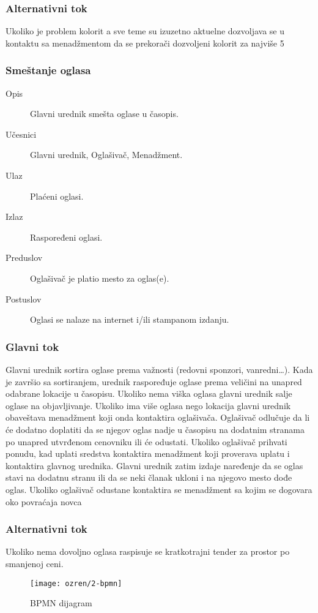 \subsubsection{Alternativni tok}
Ukoliko je problem kolorit a sve teme su izuzetno aktuelne dozvoljava se u kontaktu sa menadžmentom da se prekorači dozvoljeni kolorit za najviše 5%

\subsubsection{Smeštanje oglasa}
\begin{description}
\item [Opis] Glavni urednik smešta oglase u časopis.
\item [Učesnici] Glavni urednik, Oglašivač, Menadžment.
\item [Ulaz] Plaćeni oglasi.
\item [Izlaz] Raspoređeni oglasi.
\item [Preduslov] Oglašivač je platio mesto za oglas(e).
\item [Postuslov] Oglasi se nalaze na internet i/ili stampanom izdanju.
\end{description}   
\subsubsection{Glavni tok}
Glavni urednik sortira oglase prema važnosti (redovni sponzori, vanredni…). Kada je završio sa sortiranjem, urednik raspoređuje oglase prema veličini na unapred odabrane lokacije u časopisu. Ukoliko nema viška oglasa glavni urednik salje oglase na objavljivanje. Ukoliko ima više oglasa nego lokacija glavni urednik obaveštava menadžment koji onda kontaktira oglašivača. Oglašivač odlučuje da li će dodatno doplatiti da se njegov oglas nadje u časopisu na dodatnim stranama po unapred utvrđenom cenovniku ili će odustati. Ukoliko oglašivač prihvati ponudu, kad uplati sredstva kontaktira menadžment koji proverava uplatu i kontaktira glavnog urednika. Glavni urednik zatim izdaje naređenje da se oglas stavi na dodatnu stranu ili da se neki članak ukloni i na njegovo mesto dođe oglas. Ukoliko oglašivač odustane kontaktira se menadžment sa kojim se dogovara oko povraćaja novca
\subsubsection{Alternativni tok}
Ukoliko nema dovoljno oglasa raspisuje se kratkotrajni tender za prostor po smanjenoj ceni.

	
\begin{figure}[h]
    \centering
    \texttt{[image: ozren/2-bpmn]}
    \caption{BPMN dijagram}
    \label{pisanje}
\end{figure}	